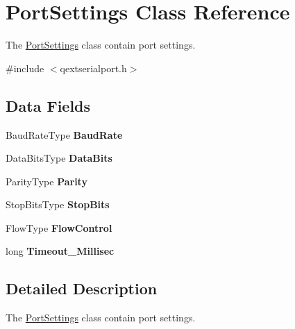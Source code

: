 \hypertarget{struct_port_settings}{}\section{Port\+Settings Class Reference}
\label{struct_port_settings}


The \mbox{\hyperlink{struct_port_settings}{Port\+Settings}} class contain port settings.  




{\ttfamily \#include $<$qextserialport.\+h$>$}

\subsection*{Data Fields}
\begin{DoxyCompactItemize}
\item 
\mbox{\label{struct_port_settings_a82b61813b5b045e549be5903609b6a4d}} 
Baud\+Rate\+Type {\bfseries Baud\+Rate}
\item 
\mbox{\label{struct_port_settings_aca06024d57e70cb619e501008e4613de}} 
Data\+Bits\+Type {\bfseries Data\+Bits}
\item 
\mbox{\label{struct_port_settings_a5be0975fd8efa68a22bf9b9bf92d5b91}} 
Parity\+Type {\bfseries Parity}
\item 
\mbox{\label{struct_port_settings_a72ef5668ba9b09f745e98ea2264b9fca}} 
Stop\+Bits\+Type {\bfseries Stop\+Bits}
\item 
\mbox{\label{struct_port_settings_aed4443b371ea15235b632e892bc3e778}} 
Flow\+Type {\bfseries Flow\+Control}
\item 
\mbox{\label{struct_port_settings_a3806c860157ce1a909ad05a9c1873f00}} 
long {\bfseries Timeout\+\_\+\+Millisec}
\end{DoxyCompactItemize}


\subsection{Detailed Description}
The \mbox{\hyperlink{struct_port_settings}{Port\+Settings}} class contain port settings. 

